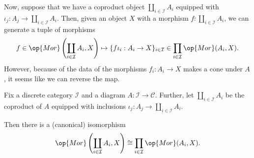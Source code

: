 \documentclass[../notes.tex]{subfiles}
\begin{document}
Now, suppose that we have a coproduct object $\coprod_{i\in\mathcal I}A_i$ equipped with $\iota_j:A_j\to\coprod_{i\in\mathcal I}A_i$. Then, given an object $X$ with a morphism $f:\coprod_{i\in\mathcal I}A_i$, we can generate a tuple of morphisms
\[f\in\op{Mor}\left(\coprod_{i\in\mathcal I}A_i,X\right)\mapsto\{f\iota_i:A_i\to X\}_{i\in\mathcal I}\in\prod_{i\in\mathcal I}\op{Mor}(A_i,X).\]
However, because of the data of the morphisms $f_i:A_i\to X$ makes a cone under $A$, it seems like we can reverse the map.
\begin{proposition} \label{prop:coprodup}
	Fix a discrete category $\mathcal I$ and a diagram $A:\mathcal I\to\mathcal C$. Further, let $\coprod_{i\in\mathcal I}A_i$ be the coproduct of $A$ equipped with inclusions $\iota_j:A_j\to\coprod_{i\in\mathcal I}A_i$.
	
	Then there is a (canonical) isomorphism
	\[\op{Mor}\left(\coprod_{i\in\mathcal I}A_i,X\right)\cong\prod_{i\in\mathcal I}\op{Mor}(A_i,X).\]
\end{proposition}
\end{document}

